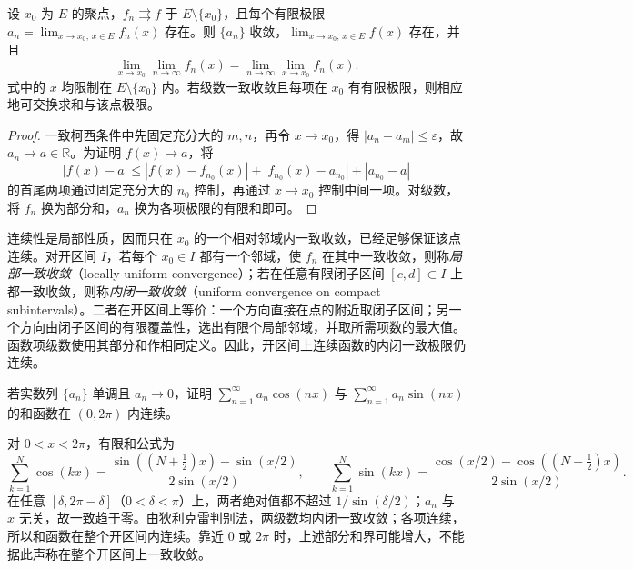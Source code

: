 \documentclass[UTF8,12pt,a4paper,fontset=fandol]{ctexbook}
\begin{document}
\begin{theorem}[一致收敛下交换两次极限]
\label{thm:exchange-limits-under-uniform-convergence}
设 $x_0$ 为 $E$ 的聚点，$f_n\rightrightarrows f$ 于 $E\setminus\{x_0\}$，且每个有限极限 $a_n=\lim_{x\to x_0,\,x\in E}f_n(x)$ 存在。则 $\{a_n\}$ 收敛，$\lim_{x\to x_0,\,x\in E}f(x)$ 存在，并且
\begin{equation}
    \lim_{x\to x_0}\lim_{n\to\infty}f_n(x)
    =\lim_{n\to\infty}\lim_{x\to x_0}f_n(x).
    \label{eq:exchange-uniform-double-limits}
\end{equation}
式中的 $x$ 均限制在 $E\setminus\{x_0\}$ 内。若级数一致收敛且每项在 $x_0$ 有有限极限，则相应地可交换求和与该点极限。
\end{theorem}

\begin{proof}
一致柯西条件中先固定充分大的 $m,n$，再令 $x\to x_0$，得 $|a_n-a_m|\leq\varepsilon$，故 $a_n\to a\in\mathbb R$。为证明 $f(x)\to a$，将
\[
    |f(x)-a|\leq|f(x)-f_{n_0}(x)|
          +|f_{n_0}(x)-a_{n_0}|+|a_{n_0}-a|
\]
的首尾两项通过固定充分大的 $n_0$ 控制，再通过 $x\to x_0$ 控制中间一项。对级数，将 $f_n$ 换为部分和，$a_n$ 换为各项极限的有限和即可。
\end{proof}

连续性是局部性质，因而只在 $x_0$ 的一个相对邻域内一致收敛，已经足够保证该点连续。对开区间 $I$，若每个 $x_0\in I$ 都有一个邻域，使 $f_n$ 在其中一致收敛，则称\emph{局部一致收敛}（locally uniform convergence）；若在任意有限闭子区间 $[c,d]\subset I$ 上都一致收敛，则称\emph{内闭一致收敛}（uniform convergence on compact subintervals）。二者在开区间上等价：一个方向直接在点的附近取闭子区间；另一个方向由闭子区间的有限覆盖性，选出有限个局部邻域，并取所需项数的最大值。函数项级数使用其部分和作相同定义。因此，开区间上连续函数的内闭一致极限仍连续。

\begin{example}
\label{ex:locally-uniform-trigonometric-series}
若实数列 $\{a_n\}$ 单调且 $a_n\to0$，证明 $\sum_{n=1}^\infty a_n\cos(nx)$ 与 $\sum_{n=1}^\infty a_n\sin(nx)$ 的和函数在 $(0,2\pi)$ 内连续。
\end{example}

\begin{solve}
对 $0<x<2\pi$，有限和公式为
\[
    \sum_{k=1}^N\cos(kx)
      =\frac{\sin((N+\tfrac12)x)-\sin(x/2)}{2\sin(x/2)},
    \qquad
    \sum_{k=1}^N\sin(kx)
      =\frac{\cos(x/2)-\cos((N+\tfrac12)x)}{2\sin(x/2)}.
\]
在任意 $[\delta,2\pi-\delta]$（$0<\delta<\pi$）上，两者绝对值都不超过 $1/\sin(\delta/2)$；$a_n$ 与 $x$ 无关，故一致趋于零。由狄利克雷判别法，两级数均内闭一致收敛；各项连续，所以和函数在整个开区间内连续。靠近 $0$ 或 $2\pi$ 时，上述部分和界可能增大，不能据此声称在整个开区间上一致收敛。
\end{solve}
\end{document}
